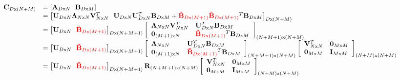 \scriptsize
\begin{equation}
\begin{array}{llll}
\mathbf{C}_{D\mathrm{x}(N+M)} &= \left[{\mathbf{A}_{D\mathrm{x}N}} \ \ \mathbf{B}_{D\mathrm{x}M}\right]\\
&= \left[\mathbf{U}_{D\mathrm{x}N}\mathbf{\Lambda}_{N\mathrm{x}N}\mathbf{V}_{N\mathrm{x}N}^T \ \ \mathbf{U}_{D\mathrm{x}N}\mathbf{U}_{D\mathrm{x}N}^T\mathbf{B}_{D\mathrm{x}M} + {\color{red}\mathbf{\tilde{B}}_{D\mathrm{x}(M+1)}} {{\color{red}\mathbf{\tilde{B}}_{D\mathrm{x}(M+1)}}^T}\mathbf{B}_{D\mathrm{x}M}\right]_{D\mathrm{x}(N+M)}\\
&= \left[\mathbf{U}_{D\mathrm{x}N} \ \ {\color{red}\mathbf{\tilde{B}}_{D\mathrm{x}(M+1)}}\right]_{D\mathrm{x}(N+M+1)}\left[\begin{array}{llll}\mathbf{\Lambda}_{N\mathrm{x}N}\mathbf{V}_{N\mathrm{x}N}^T &\mathbf{U}_{D\mathrm{x}N}^T\mathbf{B}_{D\mathrm{x}M}\\ \mathbf{0}_{(M+1)\mathrm{x}N} & {\color{red}\mathbf{\tilde{B}}_{D\mathrm{x}(M+1)}}^T\mathbf{B}_{D\mathrm{x}M}\end{array}\right]_{(N+M+1)\mathrm{x}(N+M)}\\
&= \left[\mathbf{U}_{D\mathrm{x}N} \ \ {\color{red}\mathbf{\tilde{B}}_{D\mathrm{x}(M+1)}}\right]_{D\mathrm{x}(N+M+1)}\left[\begin{array}{llll}\mathbf{\Lambda}_{N\mathrm{x}N} & \mathbf{U}_{D\mathrm{x}N}^T\mathbf{B}_{D\mathrm{x}M}\\ \mathbf{0}_{(M+1)\mathrm{x}N} & {\color{red}\mathbf{\tilde{B}}_{D\mathrm{x}(M+1)}}^T\mathbf{B}_{D\mathrm{x}M}\end{array}\right]_{(N+M+1)\mathrm{x}(N+M)} \left[\begin{array}{llll}\mathbf{V}_{N\mathrm{x}N}^T & \mathbf{0}_{M\mathrm{x}M}\\ \mathbf{0}_{M\mathrm{x}M} & \mathbf{I}_{M\mathrm{x}M}\end{array}\right]_{(N+M)\mathrm{x}(N+M)}\\
&= \left[\mathbf{U}_{D\mathrm{x}N} \ \ {\color{red}\mathbf{\tilde{B}}_{D\mathrm{x}(M+1)}}\right]_{D\mathrm{x}(N+M+1)}\mathbf{R}_{(N+M+1)\mathrm{x}(N+M)} \left[\begin{array}{llll}\mathbf{V}_{N\mathrm{x}N}^T & \mathbf{0}_{M\mathrm{x}M}\\ \mathbf{0}_{M\mathrm{x}M} & \mathbf{I}_{M\mathrm{x}M}\end{array}\right]_{(N+M)\mathrm{x}(N+M)}
\end{array}
\label{Eqn:long}
\end{equation}
\normalsize


